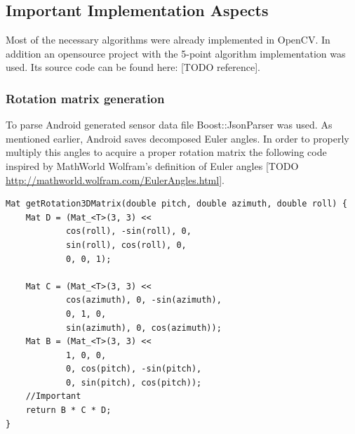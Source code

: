\subsection{Important Implementation Aspects}
Most of the necessary algorithms were already implemented in OpenCV. In addition an opensource project with the 5-point algorithm implementation was used. Its source code can be found here: [TODO reference].
\subsubsection{Rotation matrix generation}
To parse Android generated sensor data file Boost::JsonParser was used. As mentioned earlier, Android saves decomposed Euler angles. In order to properly multiply this angles to acquire a proper rotation matrix the following code inspired by MathWorld Wolfram's definition of Euler angles [TODO \url{http://mathworld.wolfram.com/EulerAngles.html}].
\begin{lstlisting}
Mat getRotation3DMatrix(double pitch, double azimuth, double roll) {
    Mat D = (Mat_<T>(3, 3) <<
            cos(roll), -sin(roll), 0,
            sin(roll), cos(roll), 0,
            0, 0, 1);

    Mat C = (Mat_<T>(3, 3) <<
            cos(azimuth), 0, -sin(azimuth),
            0, 1, 0,
            sin(azimuth), 0, cos(azimuth));
    Mat B = (Mat_<T>(3, 3) <<
            1, 0, 0,
            0, cos(pitch), -sin(pitch),
            0, sin(pitch), cos(pitch));
    //Important
    return B * C * D;
}
\end{lstlisting}
